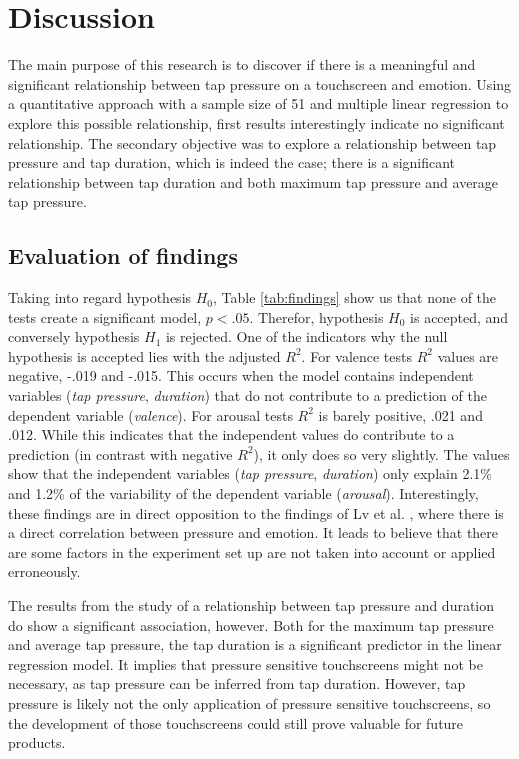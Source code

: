 \documentclass{sigchi}
\begin{document}
\section{Discussion} %
\label{sec:discussion}
The main purpose of this research is to discover if there is a meaningful and significant relationship between tap pressure on a touchscreen and emotion. Using a quantitative approach with a sample size of 51 and multiple linear regression to explore this possible relationship, first results interestingly indicate no significant relationship. The secondary objective was to explore a relationship between tap pressure and tap duration, which is indeed the case; there is a significant relationship between tap duration and both maximum tap pressure and average tap pressure. 

\subsection{Evaluation of findings} %
\label{sub:evaluation_of_findings}
Taking into regard hypothesis $H_0$, Table \ref{tab:findings} show us that none of the tests create a significant model, $p < .05$. Therefor, hypothesis $H_0$ is accepted, and conversely hypothesis $H_1$ is rejected. One of the indicators why the null hypothesis is accepted lies with the adjusted $R^2$. For valence tests $R^2$ values are negative, -.019 and -.015. This occurs when the model contains independent variables (\textit{tap pressure}, \textit{duration}) that do not contribute to a prediction of the dependent variable (\textit{valence}). For arousal tests $R^2$ is barely positive, .021 and .012. While this indicates that the independent values do contribute to a prediction (in contrast with negative $R^2$), it only does so very slightly. The values show that the independent variables (\textit{tap pressure}, \textit{duration}) only explain 2.1\% and 1.2\% of the variability of the dependent variable (\textit{arousal}). Interestingly, these findings are in direct opposition to the findings of Lv et al. \cite{H.R.LvZ.L.LinW.J.Yin2008}, where there is a direct correlation between pressure and emotion. It leads to believe that there are some factors in the experiment set up are not taken into account or applied erroneously.

The results from the study of a relationship between tap pressure and duration do show a significant association, however. Both for the maximum tap pressure and average tap pressure, the tap duration is a significant predictor in the linear regression model. It implies that pressure sensitive touchscreens might not be necessary, as tap pressure can be inferred from tap duration. However, tap pressure is likely not the only application of pressure sensitive touchscreens, so the development of those touchscreens could still prove valuable for future products.
\end{document}
